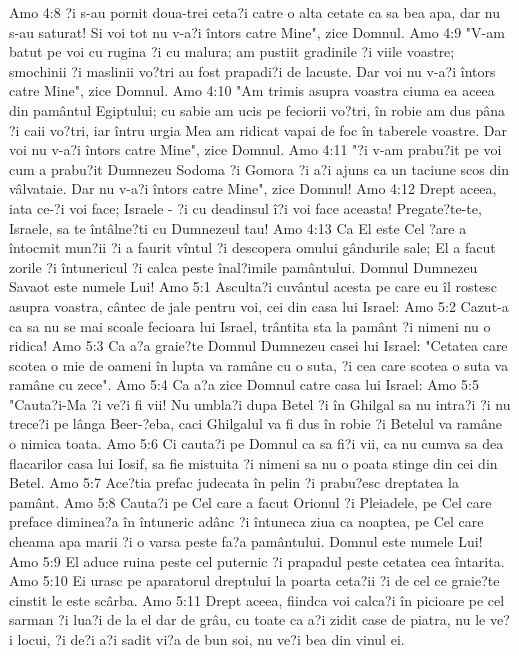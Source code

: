 Amo 4:8  ?i s-au pornit doua-trei ceta?i catre o alta cetate ca sa bea apa, dar nu s-au saturat! Si voi tot nu v-a?i întors catre Mine", zice Domnul.
Amo 4:9  "V-am batut pe voi cu rugina ?i cu malura; am pustiit gradinile ?i viile voastre; smochinii ?i maslinii vo?tri au fost prapadi?i de lacuste. Dar voi nu v-a?i întors catre Mine", zice Domnul.
Amo 4:10  "Am trimis asupra voastra ciuma ea aceea din pamântul Egiptului; cu sabie am ucis pe feciorii vo?tri, în robie am dus pâna ?i caii vo?tri, iar întru urgia Mea am ridicat vapai de foc în taberele voastre. Dar voi nu v-a?i întors catre Mine", zice Domnul.
Amo 4:11  "?i v-am prabu?it pe voi cum a prabu?it Dumnezeu Sodoma ?i Gomora ?i a?i ajuns ca un taciune scos din vâlvataie. Dar nu v-a?i întors catre Mine", zice Domnul!
Amo 4:12  Drept aceea, iata ce-?i voi face; Israele - ?i cu deadinsul î?i voi face aceasta! Pregate?te-te, Israele, sa te întâlne?ti cu Dumnezeul tau!
Amo 4:13  Ca El este Cel ?are a întocmit mun?ii ?i a faurit vîntul ?i descopera omului gândurile sale; El a facut zorile ?i întunericul ?i calca peste înal?imile pamântului. Domnul Dumnezeu Savaot este numele Lui!
Amo 5:1  Asculta?i cuvântul acesta pe care eu îl rostesc asupra voastra, cântec de jale pentru voi, cei din casa lui Israel:
Amo 5:2  Cazut-a ca sa nu se mai scoale fecioara lui Israel, trântita sta la pamânt ?i nimeni nu o ridica!
Amo 5:3  Ca a?a graie?te Domnul Dumnezeu casei lui Israel: "Cetatea care scotea o mie de oameni în lupta va ramâne cu o suta, ?i cea care scotea o suta va ramâne cu zece".
Amo 5:4  Ca a?a zice Domnul catre casa lui Israel:
Amo 5:5  "Cauta?i-Ma ?i ve?i fi vii! Nu umbla?i dupa Betel ?i în Ghilgal sa nu intra?i ?i nu trece?i pe lânga Beer-?eba, caci Ghilgalul va fi dus în robie ?i Betelul va ramâne o nimica toata.
Amo 5:6  Ci cauta?i pe Domnul ca sa fi?i vii, ca nu cumva sa dea flacarilor casa lui Iosif, sa fie mistuita ?i nimeni sa nu o poata stinge din cei din Betel.
Amo 5:7  Ace?tia prefac judecata în pelin ?i prabu?esc dreptatea la pamânt.
Amo 5:8  Cauta?i pe Cel care a facut Orionul ?i Pleiadele, pe Cel care preface diminea?a în întuneric adânc ?i întuneca ziua ca noaptea, pe Cel care cheama apa marii ?i o varsa peste fa?a pamântului. Domnul este numele Lui!
Amo 5:9  El aduce ruina peste cel puternic ?i prapadul peste cetatea cea întarita.
Amo 5:10  Ei urasc pe aparatorul dreptului la poarta ceta?ii ?i de cel ce graie?te cinstit le este scârba.
Amo 5:11  Drept aceea, fiindca voi calca?i în picioare pe cel sarman ?i lua?i de la el dar de grâu, cu toate ca a?i zidit case de piatra, nu le ve?i locui, ?i de?i a?i sadit vi?a de bun soi, nu ve?i bea din vinul ei.
